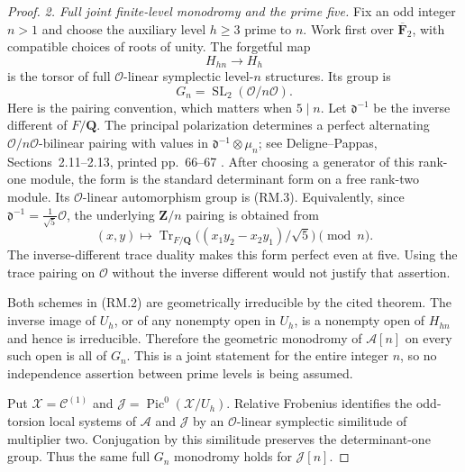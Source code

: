 \begin{proof}
\emph{2. Full joint finite-level monodromy and the prime five.}
Fix an odd integer $n>1$ and choose the auxiliary level $h\geq3$
prime to $n$.  Work first over $\overline{\mathbf F}_2$, with compatible
choices of roots of unity.  The forgetful map
\[
                      H_{hn}\longrightarrow H_h             \tag{RM.2}
\]
is the torsor of full $\mathcal O$-linear symplectic level-$n$
structures.  Its group is
\[
                         G_n=\operatorname{SL}_2(\mathcal O/n\mathcal O).
                                                               \tag{RM.3}
\]
Here is the pairing convention, which matters when $5\mid n$.
Let $\mathfrak d^{-1}$ be the inverse different of $F/\mathbf Q$.
The principal polarization determines a perfect alternating
$\mathcal O/n\mathcal O$-bilinear pairing with values in
$\mathfrak d^{-1}\otimes\mu_n$; see Deligne--Pappas,
Sections~2.11--2.13, printed pp.~66--67
\cite{DelignePappas1994}.  After choosing a generator of this
rank-one module, the form is the standard determinant form on a
free rank-two module.  Its $\mathcal O$-linear automorphism group
is (RM.3).  Equivalently, since
$\mathfrak d^{-1}=\frac1{\sqrt5}\mathcal O$, the underlying
$\mathbf Z/n$ pairing is obtained from
\[
 (x,y)\longmapsto
   \operatorname{Tr}_{F/\mathbf Q}
       \bigl((x_1y_2-x_2y_1)/\sqrt5\bigr)\pmod n.             \tag{RM.4}
\]
The inverse-different trace duality makes this form perfect even
at five.  Using the trace pairing on $\mathcal O$ without the
inverse different would not justify that assertion.

Both schemes in (RM.2) are geometrically irreducible by the cited
theorem.  The inverse image of $U_h$, or of any nonempty open in
$U_h$, is a nonempty open of $H_{hn}$ and hence is irreducible.
Therefore the geometric monodromy of $\mathcal A[n]$ on every
such open is all of $G_n$.  This is a joint statement for the
entire integer $n$, so no independence assertion between prime
levels is being assumed.

Put $\mathcal X=\mathcal C^{(1)}$ and
$\mathcal J=\operatorname{Pic}^0(\mathcal X/U_h)$.
Relative Frobenius identifies the odd-torsion local systems of
$\mathcal A$ and $\mathcal J$ by an $\mathcal O$-linear
symplectic similitude of multiplier two.  Conjugation by this
similitude preserves the determinant-one group.  Thus the same
full $G_n$ monodromy holds for $\mathcal J[n]$.


\end{proof}
